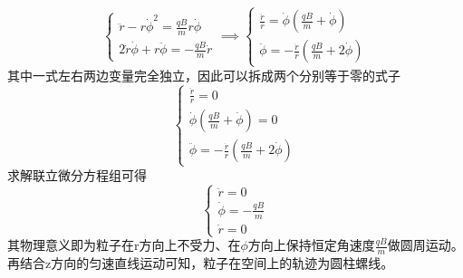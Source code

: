 \begin{equation*}
    \begin{cases}
        \ddot{r}-r\dot{\phi}^2=\frac{qB}{m}r\dot{\phi}\\
        2\dot{r}\dot{\phi}+r\ddot{\phi}=-\frac{qB}{m}\dot{r}
    \end{cases}
    \implies
    \begin{cases}
        \frac{\ddot{r}}{r}=\dot{\phi}\left(\frac{qB}{m}+\dot{\phi}\right)\\
        \ddot{\phi}=-\frac{\dot{r}}{r}\left(\frac{qB}{m}+2\dot{\phi}\right)
    \end{cases}
\end{equation*}
其中一式左右两边变量完全独立，因此可以拆成两个分别等于零的式子
\begin{equation*}
    \begin{cases}
        \frac{\ddot{r}}{r}=0\\
        \dot{\phi}\left(\frac{qB}{m}+\dot{\phi}\right)=0\\
        \ddot{\phi}=-\frac{\dot{r}}{r}\left(\frac{qB}{m}+2\dot{\phi}\right)
    \end{cases}
\end{equation*}
求解联立微分方程组可得
\begin{equation*}
    \begin{cases}
        \ddot{r}=0\\
        \dot{\phi}=-\frac{qB}{m}\\
        \dot{r}=0
    \end{cases}
\end{equation*}
其物理意义即为粒子在r方向上不受力、在$\phi$方向上保持恒定角速度$\frac{qB}{m}$做圆周运动。再结合z方向的匀速直线运动可知，粒子在空间上的轨迹为圆柱螺线。
